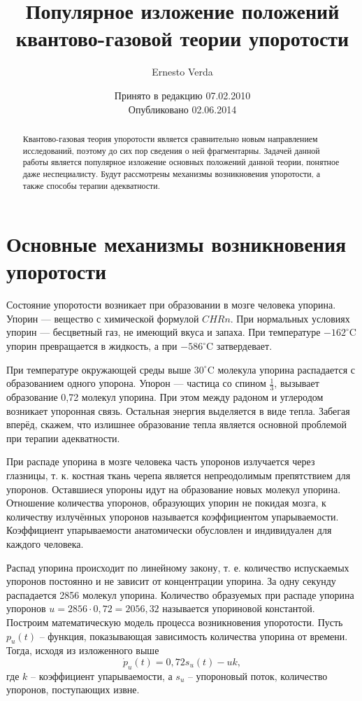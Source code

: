 \documentclass[a4paper,12pt]{article}
\title{Популярное изложение положений квантово-газовой теории упоротости}
\author{Ernesto Verda}
\date{Принято в редакцию 07.02.2010\\ Опубликовано 02.06.2014}
\begin{document}
\maketitle

\begin{abstract}
Квантово-газовая теория упоротости является сравнительно новым направлением исследований, поэтому до сих пор сведения о ней фрагментарны. Задачей данной работы является популярное изложение основных положений данной теории, понятное даже неспециалисту. Будут рассмотрены механизмы возникновения упоротости, а также способы терапии адекватности.
\end{abstract}

\section{Основные механизмы возникновения упоротости}

Состояние упоротости возникает при образовании в мозге человека упорина. Упорин — вещество с химической формулой $CHRn$. При нормальных условиях упорин — бесцветный газ, не имеющий вкуса и запаха. При температуре $-162^\circ$C упорин превращается в жидкость, а при $-586^\circ$C затвердевает.

При температуре окружающей среды выше $30^\circ$C молекула упорина распадается с образованием одного упорона. Упорон — частица со спином $\frac{1}{3}$, вызывает образование 0,72 молекул упорина. При этом между радоном и углеродом возникает упоронная связь. Остальная энергия выделяется в виде тепла. Забегая вперёд, скажем, что излишнее образование тепла является основной проблемой при терапии адекватности.

При распаде упорина в мозге человека часть упоронов излучается через глазницы, т. к. костная ткань черепа является непреодолимым препятствием для упоронов. Оставшиеся упороны идут на образование новых молекул упорина. Отношение количества упоронов, образующих упорин не покидая мозга, к количеству излучённых упоронов называется коэффициентом упарываемости. Коэффициент упарываемости анатомически обусловлен и индивидуален для каждого человека.

Распад упорина происходит по линейному закону, т. е. количество испускаемых упоронов постоянно и не зависит от концентрации упорина. За одну секунду распадается 2856 молекул упорина. Количество образуемых при распаде упорина упоронов $u=2856\cdot 0,72=2056,32$ называется упориновой константой. Построим математическую модель процесса возникновения упоротости. Пусть $p_{u}(t)$ -- функция, показывающая зависимость количества упорина от времени. Тогда, исходя из изложенного выше
\begin{equation}
\dot{p}_{u}(t)=0,72s_{u}(t)-uk,
\end{equation}
где $k$ -- коэффициент упарываемости, а $s_{u}$ -- упороновый поток, количество упоронов, поступающих извне.
\end{document}
